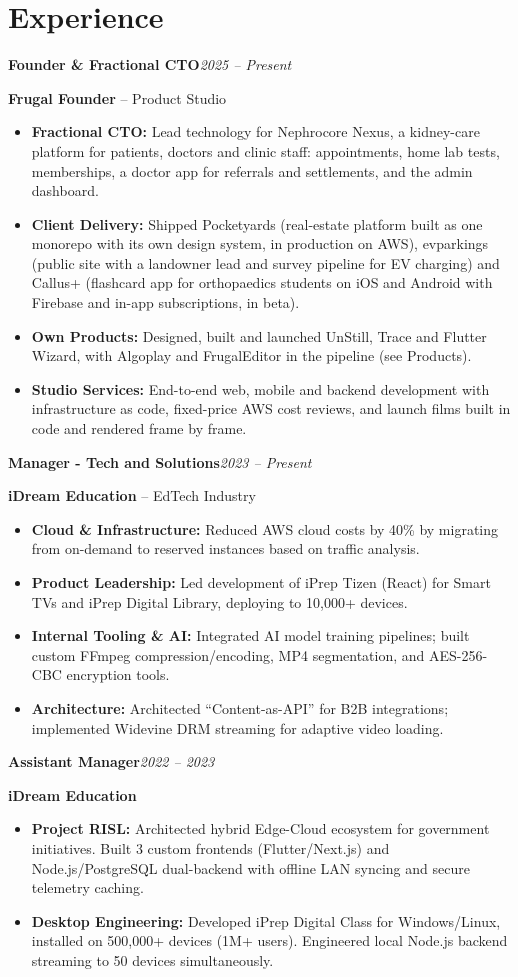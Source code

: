 \documentclass[10pt,a4paper]{article}
\newcommand{\role}[2]{\needspace{4\baselineskip}\textbf{\color{navy}#1}\hfill\textit{#2}\par}
\newcommand{\org}[2]{\textbf{#1}#2\par}
\newcommand{\gap}{\vspace{6.5pt}}
\renewcommand{\b}[1]{\textbf{#1}}
\begin{document}
\section{Experience}
\role{Founder \& Fractional CTO}{2025 – Present}
\org{Frugal Founder}{ – Product Studio}
\begin{itemize}
\item \b{Fractional CTO:} Lead technology for Nephrocore Nexus, a kidney-care platform for patients, doctors and clinic staff: appointments, home lab tests, memberships, a doctor app for referrals and settlements, and the admin dashboard.
\item \b{Client Delivery:} Shipped Pocketyards (real-estate platform built as one monorepo with its own design system, in production on AWS), evparkings (public site with a landowner lead and survey pipeline for EV charging) and Callus+ (flashcard app for orthopaedics students on iOS and Android with Firebase and in-app subscriptions, in beta).
\item \b{Own Products:} Designed, built and launched UnStill, Trace and Flutter Wizard, with Algoplay and FrugalEditor in the pipeline (see Products).
\item \b{Studio Services:} End-to-end web, mobile and backend development with infrastructure as code, fixed-price AWS cost reviews, and launch films built in code and rendered frame by frame.
\end{itemize}
\gap

\role{Manager - Tech and Solutions}{2023 – Present}
\org{iDream Education}{ – EdTech Industry}
\begin{itemize}
\item \b{Cloud \& Infrastructure:} Reduced AWS cloud costs by 40\% by migrating from on-demand to reserved instances based on traffic analysis.
\item \b{Product Leadership:} Led development of iPrep Tizen (React) for Smart TVs and iPrep Digital Library, deploying to 10,000+ devices.
\item \b{Internal Tooling \& AI:} Integrated AI model training pipelines; built custom FFmpeg compression/encoding, MP4 segmentation, and AES-256-CBC encryption tools.
\item \b{Architecture:} Architected ``Content-as-API'' for B2B integrations; implemented Widevine DRM streaming for adaptive video loading.
\end{itemize}
\gap

\role{Assistant Manager}{2022 – 2023}
\org{iDream Education}{}
\begin{itemize}
\item \b{Project RISL:} Architected hybrid Edge-Cloud ecosystem for government initiatives. Built 3 custom frontends (Flutter/Next.js) and Node.js/PostgreSQL dual-backend with offline LAN syncing and secure telemetry caching.
\item \b{Desktop Engineering:} Developed iPrep Digital Class for Windows/Linux, installed on 500,000+ devices (1M+ users). Engineered local Node.js backend streaming to 50 devices simultaneously.
\end{itemize}
\gap
\end{document}

